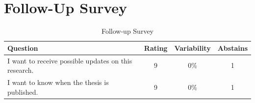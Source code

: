 \section{Follow-Up Survey}
\begin{table}[!h]
	\centering
	\begin{tabular}{p{}ccc}
		\toprule
		\textbf{Question} & \textbf{Rating} & \textbf{Variability} & \textbf{Abstains} \\
		\midrule
		I want to receive possible updates on this research. & 9 & 0\% & 1 \\%
		I want to know when the thesis is published. & 9 & 0\% & 1 \\%
		\bottomrule
	\end{tabular}%
	\caption{Follow-up Survey}
	\label{tab:appfollowupsurvey}%
\end{table}%